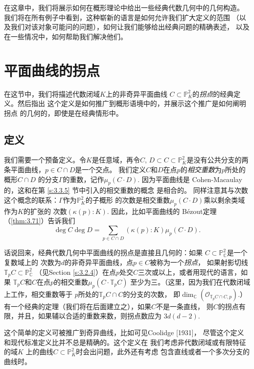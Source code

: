 在这章中，我们将展示如何在概形理论中给出一些经典代数几何中的几何构造。
我们将在所有例子中看到，这种崭新的语言是如何允许我们扩大定义的范围
（以及我们对该对象可能问的问题），如何让我们能够给出经典问题的精确表述，
以及在一些情况中，如何帮助我们解决他们。

\section{平面曲线的拐点}\label{s:4.1}

在这节中，我们将描述代数闭域$K$上的非奇异平面曲线
$C\subset \mathbb P_K^2$的\textit{拐点}的经典定义。然后指出
这个定义是如何推广到概形语境中的，并展示这个推广是如何阐明拐点
的几何的，即使是在经典情形中。

\subsection{定义}\label{s:4.1.1}

我们需要一个预备定义。令$K$是任意域，再令$C$, $D\subset C\subset \mathbb P_K^2$是没有公共分支的两条平面曲线，$p\in C\cap D$是一个交点。
我们定义$C$和$D$在点$p$的\textit{相交重数}为$p$所处的概形$C\cap D$
的分支$\Gamma$的重数，记作$\mu_p(C\cdot D)$. 因为平面曲线是
Cohen-Macaulay的，这和在第 \ref{s:3.3.5} 节中引入的相交重数的概念
是相合的。%
同样注意其与次数这个概念的联系：$\Gamma$作为$\mathbb P_K^2$的子概形
的次数是相交重数$\mu_p(C\cdot D)$乘以剩余类域作为$K$的扩张的
次数$(\kappa(p):K)$. 因此，比如平面曲线的
B\'ezout定理（\ref{thm:3.71}）告诉我们
\[
	\deg C\deg D=\sum_{p\in C\cap D}
	(\kappa(p):K)\mu_p(C\cdot D).
\]

话说回来，经典代数几何中平面曲线的拐点是直接且几何的：如果
$C\subset \mathbb P_{\mathbb C}^2$是一个复数域上的
次数为$d$的非奇异平面曲线，点$p\in C$被称为一个\textit{拐点}，
如果射影切线$\mathbb T_pC\subset \mathbb P_{\mathbb C}^2$
（见Section \ref{s:3.2.4}）在点$p$处交$C$三次或以上，或者用现代的语言，如果
$\mathbb T_pC$和$C$在点$p$的相交重数$\mu_p(C\cdot \mathbb T_pC)$
至少为三。（这里，因为我们在代数闭域上工作，相交重数等于
$p$所处的$\mathbb T_pC\cap C$的分支的次数，
即$\dim_{\mathbb C}(\mathscr O_{\mathbb T_pC\cap C,p})$.）
有一个经典的定理（我们将在后面建立之），如果$C$不是一条直线，
则$C$的拐点有限，并且，如果辅以合适的重数来数，则拐点数应为
$3d(d-2)$.

这个简单的定义可被推广到奇异曲线，比如可见Coolidge [1931]，
尽管这个定义和现代标准定义比并不总是精确的。这个定义在
我们考虑非代数闭域或有限特征的域$K$
上的曲线$C\subset \mathbb P_K^2$时会出问题，此外还有考虑
包含直线或者一个多次分支的曲线时。

